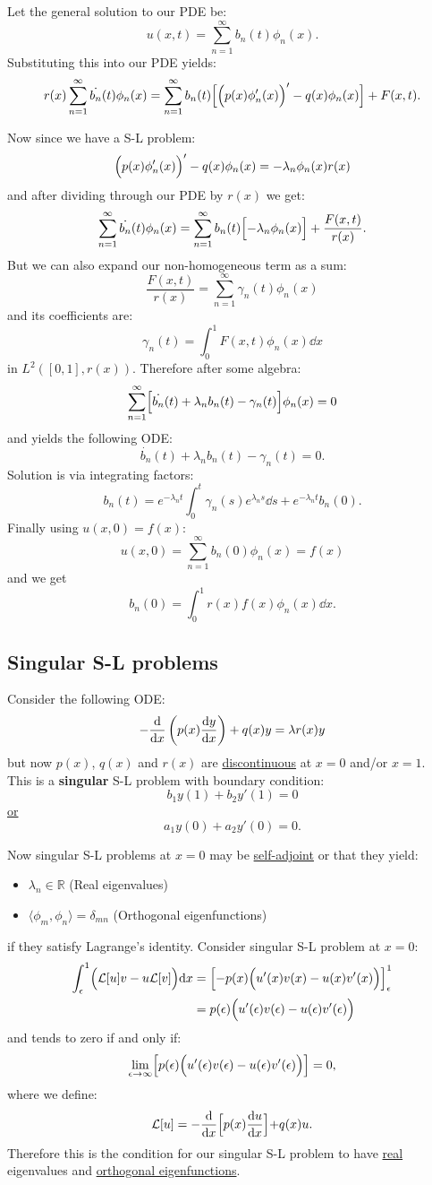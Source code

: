\documentclass{article}
\begin{document}
Let the general solution to our PDE be:
$$u(x,t)=\sum_{n=1}^{\infty}b_n(t)\phi_n(x).$$
Substituting this into our PDE yields:
$$r(x)\sum_{n=1}^{\infty}\dot{b_n}(t)\phi_n(x)
=\sum_{n=1}^{\infty}b_n(t)\Bigl[\Bigl(p(x)
\phi'_n(x)\Bigr)'-q(x)\phi_n(x)\Bigr]+F(x,t).$$

\newpage

Now since we have a S-L problem:
$$\Bigl(p(x)\phi'_n(x)\Bigr)'-q(x)\phi_n(x)
=-\lambda_n\phi_n(x)r(x)$$
and after dividing through our PDE by $r(x)$ we get:
$$\sum_{n=1}^{\infty}\dot{b_n}(t)\phi_n(x)
=\sum_{n=1}^{\infty}b_n(t)\Bigl[-\lambda_n\phi_n(x)\Bigr]
+\frac{F(x,t)}{r(x)}.$$
But we can also expand our non-homogeneous term as a sum:
$$\frac{F(x,t)}{r(x)}=\sum_{n=1}^{\infty}\gamma_n(t)\phi_n(x)$$
and its coefficients are:
$$\gamma_n(t)=\int_{0}^{1}F(x,t)\phi_n(x)\dd x$$
in $L^2([0,1],r(x))$. Therefore after some algebra:
$$\sum_{n=1}^{\infty}\Bigl[\dot{b_n}(t)
+\lambda_n b_n(t)-\gamma_n(t)\Bigr]\phi_n(x)=0$$
and yields the following ODE:
$$\dot{b_n}(t)
+\lambda_n b_n(t)-\gamma_n(t)=0.$$
Solution is via integrating factors:
$$b_n(t)=e^{-\lambda_n t}
\int_{0}^{t}\gamma_n(s)e^{\lambda_n s}\dd s
+e^{-\lambda_n t}b_n(0).$$
Finally using $u(x,0)=f(x)$:
$$u(x,0)=\sum_{n=1}^{\infty}b_n(0)\phi_n(x)
=f(x)$$
and we get
$$b_n(0)=\int_{0}^{1}r(x)f(x)\phi_n(x)\dd x.$$
\newpage

\subsection{Singular S-L problems}
Consider the following ODE:
$$-\dv{x}\left(p(x)\dv{y}{x}\right)+q(x)y=\lambda r(x)y$$
but now $p(x)$, $q(x)$ and $r(x)$ are \underline{discontinuous}
at $x=0$ and/or $x=1$. \\
This is a \textbf{singular} S-L problem with boundary condition:
$$b_1 y(1)+b_2 y'(1)=0$$
\underline{or}
$$a_1 y(0)+a_2 y'(0)=0.$$

Now singular S-L problems at $x=0$ may be \underline{self-adjoint} or that they yield:
\begin{itemize}
    \item $\lambda_n\in\mathbb{R}$ (Real eigenvalues)
    \item $\langle \phi_m,\phi_n \rangle=\delta_{mn}$
    (Orthogonal eigenfunctions)
\end{itemize}
if they satisfy Lagrange's identity. Consider singular S-L problem at $x=0$:
\begin{align*}
    \int_{\epsilon}^{1}\Bigl(\mathcal{L}[u]v
    -u\mathcal{L}[v]\Bigr)\dd x
    &=\Bigl[-p(x)
    \Bigl(u'(x)v(x)-u(x)v'(x)\Bigr)\Bigr]_{\epsilon}^{1} \\
    &=p(\epsilon)
    \Bigl(u'(\epsilon)v(\epsilon)-u(\epsilon)v'(\epsilon)\Bigr)
\end{align*}
and tends to zero if and only if:
$$\lim_{\epsilon\rightarrow\infty}
\Bigl[p(\epsilon)
\Bigl(u'(\epsilon)v(\epsilon)-u(\epsilon)v'(\epsilon)\Bigr)\Bigr]=0,$$
where we define:
$$\mathcal{L}[u]=-\dv{x}\Bigl[p(x)\dv{u}{x}\Bigl]+q(x)u.$$
Therefore this is the condition for our singular S-L
problem to have \underline{real} eigenvalues and 
\underline{orthogonal eigenfunctions}.
\end{document}
